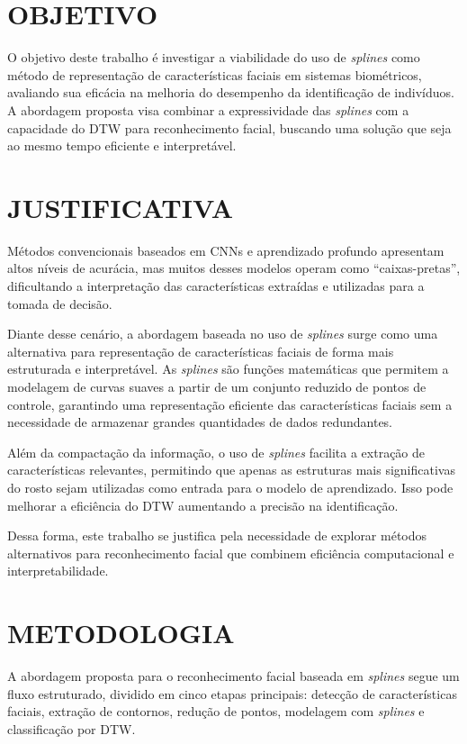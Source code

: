 \section{OBJETIVO}

O objetivo deste trabalho é investigar a viabilidade do uso de \textit{splines} como método de representação de características faciais em sistemas biométricos, avaliando sua eficácia na melhoria do desempenho da identificação de indivíduos. A abordagem proposta visa combinar a expressividade das \textit{splines} com a capacidade do DTW para reconhecimento facial, buscando uma solução que seja ao mesmo tempo eficiente e interpretável.

\section{JUSTIFICATIVA}

Métodos convencionais baseados em CNNs e aprendizado profundo apresentam altos níveis de acurácia, mas muitos desses modelos operam como “caixas-pretas”, dificultando a interpretação das características extraídas e utilizadas para a tomada de decisão.

Diante desse cenário, a abordagem baseada no uso de \textit{splines} surge como uma alternativa para representação de características faciais de forma mais estruturada e interpretável. As \textit{splines} são funções matemáticas que permitem a modelagem de curvas suaves a partir de um conjunto reduzido de pontos de controle, garantindo uma representação eficiente das características faciais sem a necessidade de armazenar grandes quantidades de dados redundantes.

Além da compactação da informação, o uso de \textit{splines} facilita a extração de características relevantes, permitindo que apenas as estruturas mais significativas do rosto sejam utilizadas como entrada para o modelo de aprendizado. Isso pode melhorar a eficiência do DTW aumentando a precisão na identificação.

Dessa forma, este trabalho se justifica pela necessidade de explorar métodos alternativos para reconhecimento facial que combinem eficiência computacional e interpretabilidade.

\section{METODOLOGIA}

A abordagem proposta para o reconhecimento facial baseada em \textit{splines} segue um fluxo estruturado, dividido em cinco etapas principais: detecção de características faciais, extração de contornos, redução de pontos, modelagem com \textit{splines} e classificação por DTW.

